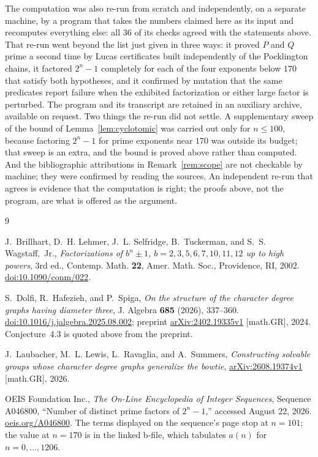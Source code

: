 \documentclass[11pt]{amsart}
\theoremstyle{remark}
\begin{document}
The computation was also re-run from scratch and independently, on a
separate machine, by a program that takes the numbers claimed here as
its input and recomputes everything else: all $36$ of its checks agreed
with the statements above. That re-run went beyond the list just given
in three ways: it proved $P$ and $Q$ prime a second time by Lucas
certificates built independently of the Pocklington chains, it
factored $2^n-1$ completely for each of the four exponents below $170$
that satisfy both hypotheses, and it confirmed by mutation that the
same predicates report failure when the exhibited factorization or
either large factor is perturbed. The program and its transcript are
retained in an auxiliary archive, available on request. Two things the
re-run did not settle. A supplementary sweep of the bound of
Lemma~\ref{lem:cyclotomic} was carried out only for $n\le100$, because
factoring $2^n-1$ for prime exponents near $170$ was outside its
budget; that sweep is an extra, and the bound is proved above rather
than computed. And the bibliographic attributions in
Remark~\ref{rem:scope} are not checkable by machine; they were
confirmed by reading the sources. An independent re-run that agrees is
evidence that the computation is right; the proofs above, not the
program, are what is offered as the argument.

\begin{thebibliography}{9}

J.~Brillhart, D.~H. Lehmer, J.~L. Selfridge, B.~Tuckerman, and
S.~S. Wagstaff,~Jr.,
\emph{Factorizations of $b^n\pm1$, $b=2,3,5,6,7,10,11,12$ up to high
powers}, 3rd ed., Contemp. Math. \textbf{22},
Amer. Math. Soc., Providence, RI, 2002.
\href{https://doi.org/10.1090/conm/022}{doi:10.1090/conm/022}.

S.~Dolfi, R.~Hafezieh, and P.~Spiga,
\emph{On the structure of the character degree graphs having diameter three},
J. Algebra \textbf{685} (2026), 337--360.
\href{https://doi.org/10.1016/j.jalgebra.2025.08.002}
{doi:10.1016/j.jalgebra.2025.08.002};
preprint \href{https://arxiv.org/abs/2402.19335}{arXiv:2402.19335v1}
[math.GR], 2024. Conjecture~4.3 is quoted above from the preprint.

J.~Laubacher, M.~L. Lewis, L.~Ravaglia, and A.~Summers,
\emph{Constructing solvable groups whose character degree graphs
generalize the bowtie},
\href{https://arxiv.org/abs/2608.19374}{arXiv:2608.19374v1}
[math.GR], 2026.

OEIS Foundation Inc.,
\emph{The On-Line Encyclopedia of Integer Sequences},
Sequence A046800, ``Number of distinct prime factors of $2^n-1$,''
accessed August 22, 2026.
\href{https://oeis.org/A046800}{oeis.org/A046800}.
The terms displayed on the sequence's page stop at $n=101$; the value
at $n=170$ is in the linked b-file, which tabulates $a(n)$ for
$n=0,\dots,1206$.

\end{thebibliography}
\end{document}
